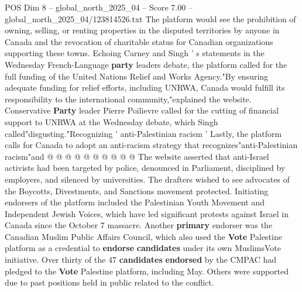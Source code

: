 \begin{textsample}{POS Dim 8 – global\_north\_2025\_04 – Score 7.00 – global\_north\_2025\_04/123814526.txt}
The platform would see the prohibition of owning, selling, or renting properties in the disputed territories by anyone in Canada and the revocation of charitable status for Canadian organizations supporting these towns.
Echoing Carney and Singh ' s statements in the Wednesday French-Language \textbf{party} leaders debate, the platform called for the full funding of the United Nations Relief and Works Agency."By ensuring adequate funding for relief efforts, including UNRWA, Canada would fulfill its responsibility to the international community,"explained the website.
Conservative \textbf{Party} leader Pierre Poilievre called for the cutting of financial support to UNRWA at the Wednesday debate, which Singh called"disgusting."Recognizing ' anti-Palestinian racism ' Lastly, the platform calls for Canada to adopt an anti-racism strategy that recognizes"anti-Palestinian racism"and @ @ @ @ @ @ @ @ @ @ The website asserted that anti-Israel activists had been targeted by police, denounced in Parliament, disciplined by employers, and silenced by universities.
The drafters wished to see advocates of the Boycotts, Divestments, and Sanctions movement protected.
Initiating endorsers of the platform included the Palestinian Youth Movement and Independent Jewish Voices, which have led significant protests against Israel in Canada since the October 7 massacre.
Another \textbf{primary} endorser was the Canadian Muslim Public Affairs Council, which also used the \textbf{Vote} Palestine platform as a credential to \textbf{endorse} \textbf{candidates} under its own MuslimsVote initiative.
Over thirty of the 47 \textbf{candidates} \textbf{endorsed} by the CMPAC had pledged to the \textbf{Vote} Palestine platform, including May.
Others were supported due to past positions held in public related to the conflict.

\end{textsample}
